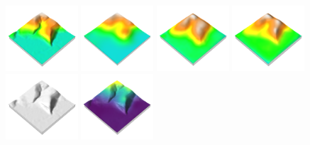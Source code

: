 \documentclass[prodmode,acmtochi]{acmsmall} %
\begin{document}

\begin{figure}[h!]
\begin{center}
		\includegraphics[width=0.24\textwidth]{images/render_3d/dem_1.png}
		\includegraphics[width=0.24\textwidth]{images/render_3d/mean_dem_1.png}
		\includegraphics[width=0.24\textwidth]{images/render_3d/mean_dem_2.png}
		\includegraphics[width=0.24\textwidth]{images/render_3d/mean_dem_3.png}
		\includegraphics[width=0.24\textwidth]{images/render_3d/dem_difference_1.png}
		\includegraphics[width=0.24\textwidth]{images/render_3d/stdev_dem_1.png}

\end{center}
\end{figure}
\end{document}
